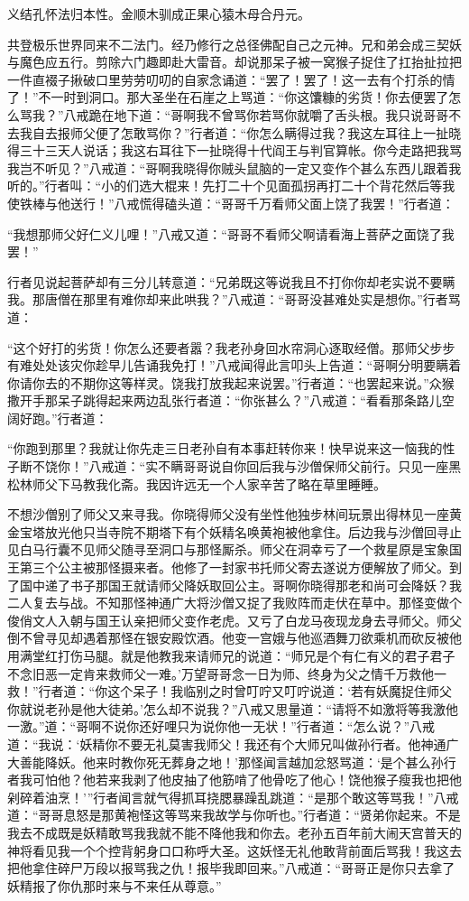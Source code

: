 \documentclass[12pt,UTF8]{ctexbook}
\begin{document}
{义结孔怀法归本性。金顺木驯成正果心猿木母合丹元。

共登极乐世界同来不二法门。经乃修行之总径佛配自己之元神。兄和弟会成三契妖与魔色应五行。剪除六门趣即赴大雷音。却说那呆子被一窝猴子捉住了扛抬扯拉把一件直裰子揪破口里劳劳叨叨的自家念诵道：“罢了！罢了！这一去有个打杀的情了！”不一时到洞口。那大圣坐在石崖之上骂道：“你这馕糠的劣货！你去便罢了怎么骂我？”八戒跪在地下道：“哥啊我不曾骂你若骂你就嚼了舌头根。我只说哥哥不去我自去报师父便了怎敢骂你？”行者道：“你怎么瞒得过我？我这左耳往上一扯晓得三十三天人说话；我这右耳往下一扯晓得十代阎王与判官算帐。你今走路把我骂我岂不听见？”八戒道：“哥啊我晓得你贼头鼠脑的一定又变作个甚么东西儿跟着我听的。”行者叫：“小的们选大棍来！先打二十个见面孤拐再打二十个背花然后等我使铁棒与他送行！”八戒慌得磕头道：“哥哥千万看师父面上饶了我罢！”行者道：

“我想那师父好仁义儿哩！”八戒又道：“哥哥不看师父啊请看海上菩萨之面饶了我罢！”

行者见说起菩萨却有三分儿转意道：“兄弟既这等说我且不打你你却老实说不要瞒我。那唐僧在那里有难你却来此哄我？”八戒道：“哥哥没甚难处实是想你。”行者骂道：

“这个好打的劣货！你怎么还要者嚣？我老孙身回水帘洞心逐取经僧。那师父步步有难处处该灾你趁早儿告诵我免打！”八戒闻得此言叩头上告道：“哥啊分明要瞒着你请你去的不期你这等样灵。饶我打放我起来说罢。”行者道：“也罢起来说。”众猴撒开手那呆子跳得起来两边乱张行者道：“你张甚么？”八戒道：“看看那条路儿空阔好跑。”行者道：

“你跑到那里？我就让你先走三日老孙自有本事赶转你来！快早说来这一恼我的性子断不饶你！”八戒道：“实不瞒哥哥说自你回后我与沙僧保师父前行。只见一座黑松林师父下马教我化斋。我因许远无一个人家辛苦了略在草里睡睡。

不想沙僧别了师父又来寻我。你晓得师父没有坐性他独步林间玩景出得林见一座黄金宝塔放光他只当寺院不期塔下有个妖精名唤黄袍被他拿住。后边我与沙僧回寻止见白马行囊不见师父随寻至洞口与那怪厮杀。师父在洞幸亏了一个救星原是宝象国王第三个公主被那怪摄来者。他修了一封家书托师父寄去遂说方便解放了师父。到了国中递了书子那国王就请师父降妖取回公主。哥啊你晓得那老和尚可会降妖？我二人复去与战。不知那怪神通广大将沙僧又捉了我败阵而走伏在草中。那怪变做个俊俏文人入朝与国王认亲把师父变作老虎。又亏了白龙马夜现龙身去寻师父。师父倒不曾寻见却遇着那怪在银安殿饮酒。他变一宫娥与他巡酒舞刀欲乘机而砍反被他用满堂红打伤马腿。就是他教我来请师兄的说道：“师兄是个有仁有义的君子君子不念旧恶一定肯来救师父一难。’万望哥哥念一日为师、终身为父之情千万救他一救！”行者道：“你这个呆子！我临别之时曾叮咛又叮咛说道：‘若有妖魔捉住师父你就说老孙是他大徒弟。’怎么却不说我？”八戒又思量道：“请将不如激将等我激他一激。”道：“哥啊不说你还好哩只为说你他一无状！”行者道：“怎么说？”八戒道：“我说：‘妖精你不要无礼莫害我师父！我还有个大师兄叫做孙行者。他神通广大善能降妖。他来时教你死无葬身之地！’那怪闻言越加忿怒骂道：‘是个甚么孙行者我可怕他？他若来我剥了他皮抽了他筋啃了他骨吃了他心！饶他猴子瘦我也把他剁碎着油烹！’”行者闻言就气得抓耳挠腮暴躁乱跳道：“是那个敢这等骂我！”八戒道：“哥哥息怒是那黄袍怪这等骂来我故学与你听也。”行者道：“贤弟你起来。不是我去不成既是妖精敢骂我我就不能不降他我和你去。老孙五百年前大闹天宫普天的神将看见我一个个控背躬身口口称呼大圣。这妖怪无礼他敢背前面后骂我！我这去把他拿住碎尸万段以报骂我之仇！报毕我即回来。”八戒道：“哥哥正是你只去拿了妖精报了你仇那时来与不来任从尊意。”

}
\end{document}
